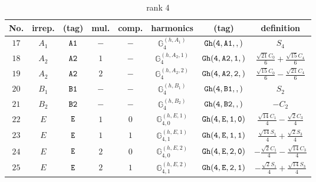 \documentclass[fleqn,8pt]{jsarticle}
\begin{document}
\begin{table}[ht!]
\begin{center}
\caption{rank 4}
\renewcommand{\arraystretch}{1.3}
\begin{tabular}{cccccccc} \hline \hline
No. & irrep. & (tag) & mul. & comp. & harmonics & (tag) & definition \\ \hline
$ 17 $ & $ A_{1} $ & $ {\tt A1} $ & $ - $ & $ - $ & $ \mathbb{G}_{4}^{(h,A_{1})} $ & $ {\tt Gh(4,A1,,)} $ & $ S_{4} $ \\
$ 18 $ & $ A_{2} $ & $ {\tt A2} $ & $ 1 $ & $ - $ & $ \mathbb{G}_{4}^{(h,A_{2},1)} $ & $ {\tt Gh(4,A2,1,)} $ & $ \frac{\sqrt{21} C_{0}}{6} + \frac{\sqrt{15} C_{4}}{6} $ \\
$ 19 $ & $ A_{2} $ & $ {\tt A2} $ & $ 2 $ & $ - $ & $ \mathbb{G}_{4}^{(h,A_{2},2)} $ & $ {\tt Gh(4,A2,2,)} $ & $ \frac{\sqrt{15} C_{0}}{6} - \frac{\sqrt{21} C_{4}}{6} $ \\
$ 20 $ & $ B_{1} $ & $ {\tt B1} $ & $ - $ & $ - $ & $ \mathbb{G}_{4}^{(h,B_{1})} $ & $ {\tt Gh(4,B1,,)} $ & $ S_{2} $ \\
$ 21 $ & $ B_{2} $ & $ {\tt B2} $ & $ - $ & $ - $ & $ \mathbb{G}_{4}^{(h,B_{2})} $ & $ {\tt Gh(4,B2,,)} $ & $ - C_{2} $ \\
$ 22 $ & $ E $ & $ {\tt E} $ & $ 1 $ & $ 0 $ & $ \mathbb{G}_{4,0}^{(h,E,1)} $ & $ {\tt Gh(4,E,1,0)} $ & $ \frac{\sqrt{14} C_{1}}{4} - \frac{\sqrt{2} C_{3}}{4} $ \\
$ 23 $ & $ E $ & $ {\tt E} $ & $ 1 $ & $ 1 $ & $ \mathbb{G}_{4,1}^{(h,E,1)} $ & $ {\tt Gh(4,E,1,1)} $ & $ \frac{\sqrt{14} S_{1}}{4} + \frac{\sqrt{2} S_{3}}{4} $ \\
$ 24 $ & $ E $ & $ {\tt E} $ & $ 2 $ & $ 0 $ & $ \mathbb{G}_{4,0}^{(h,E,2)} $ & $ {\tt Gh(4,E,2,0)} $ & $ - \frac{\sqrt{2} C_{1}}{4} - \frac{\sqrt{14} C_{3}}{4} $ \\
$ 25 $ & $ E $ & $ {\tt E} $ & $ 2 $ & $ 1 $ & $ \mathbb{G}_{4,1}^{(h,E,2)} $ & $ {\tt Gh(4,E,2,1)} $ & $ - \frac{\sqrt{2} S_{1}}{4} + \frac{\sqrt{14} S_{3}}{4} $ \\
 \hline \hline
\end{tabular}
\end{center}
\end{table}
\end{document}
